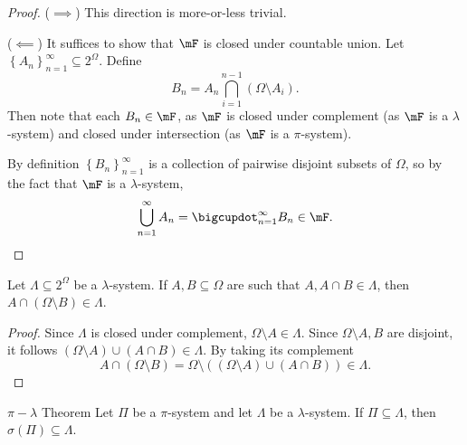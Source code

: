 \documentclass[stat901]{subfiles}
\begin{document}
    \begin{proof}
        ($\implies$) This direction is more-or-less trivial.

        ($\impliedby$) It suffices to show that $\mF$ is closed under countable union. Let $\left\lbrace A_n \right\rbrace^{\infty}_{n=1}\subseteq 2^{\Omega}$. Define
        \begin{equation*}
            B_n = A_n \bigcap^{n-1}_{i=1} \left( \Omega\setminus A_i \right).
        \end{equation*}
        Then note that each $B_n\in\mF$, as $\mF$ is closed under complement (as $\mF$ is a $\lambda$-system) and closed under intersection (as $\mF$ is a $\pi$-system). 

        By definition $\left\lbrace B_n \right\rbrace^{\infty}_{n=1}$ is a collection of pairwise disjoint subsets of $\Omega$, so by the fact that $\mF$ is a $\lambda$-system,
        \begin{equation*}
            \bigcup^{\infty}_{n=1} A_n = \bigcupdot^{\infty}_{n=1} B_n \in \mF.
        \end{equation*}
    \end{proof}

    \begin{prop}{}
        Let $\Lambda\subseteq 2^{\Omega}$ be a $\lambda$-system. If $A,B\subseteq\Omega$ are such that $A,A\cap B\in\Lambda$, then $A\cap\left( \Omega\setminus B \right)\in\Lambda$.
    \end{prop}

    \begin{proof}
        Since $\Lambda$ is closed under complement, $\Omega\setminus A\in\Lambda$. Since $\Omega\setminus A, B$ are disjoint, it follows $\left( \Omega\setminus A \right)\cup\left( A\cap B \right)\in\Lambda$. By taking its complement
        \begin{equation*}
            A\cap \left( \Omega\setminus B \right) = \Omega\setminus\left( \left( \Omega\setminus A \right)\cup \left( A\cap B \right) \right) \in \Lambda.
        \end{equation*}
    \end{proof}

    \begin{theorem}{$\pi-\lambda$ Theorem}
        Let $\Pi$ be a $\pi$-system and let $\Lambda$ be a $\lambda$-system. If $\Pi\subseteq\Lambda$, then $\sigma\left( \Pi \right)\subseteq\Lambda$.        
    \end{theorem}
\end{document}
